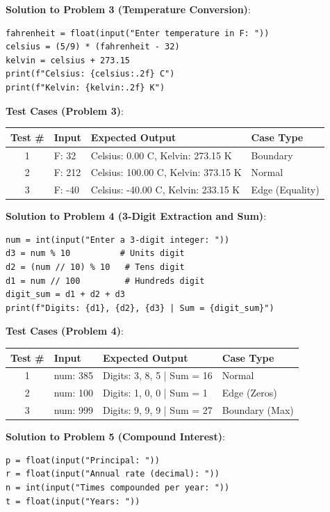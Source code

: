 \begin{solutionbox}
\noindent\textbf{Solution to Problem 3 (Temperature Conversion)}:
\begin{lstlisting}[language=Python3]
fahrenheit = float(input("Enter temperature in F: "))
celsius = (5/9) * (fahrenheit - 32)
kelvin = celsius + 273.15
print(f"Celsius: {celsius:.2f} C")
print(f"Kelvin: {kelvin:.2f} K")
\end{lstlisting}
\vspace{4pt}
\noindent\textbf{Test Cases (Problem 3)}:

\noindent\begin{tabular}{|c|p{4cm}|p{4.5cm}|p{2.2cm}|}
\hline
\textbf{Test \#} & \textbf{Input} & \textbf{Expected Output} & \textbf{Case Type} \\
\hline
1 & F: 32 & Celsius: 0.00 C, Kelvin: 273.15 K & Boundary \\
2 & F: 212 & Celsius: 100.00 C, Kelvin: 373.15 K & Normal \\
3 & F: -40 & Celsius: -40.00 C, Kelvin: 233.15 K & Edge (Equality) \\
\hline
\end{tabular}
\vspace{8pt}

\noindent\textbf{Solution to Problem 4 (3-Digit Extraction and Sum)}:
\begin{lstlisting}[language=Python3]
num = int(input("Enter a 3-digit integer: "))
d3 = num % 10          # Units digit
d2 = (num // 10) % 10   # Tens digit
d1 = num // 100         # Hundreds digit
digit_sum = d1 + d2 + d3
print(f"Digits: {d1}, {d2}, {d3} | Sum = {digit_sum}")
\end{lstlisting}
\vspace{4pt}
\noindent\textbf{Test Cases (Problem 4)}:

\noindent\begin{tabular}{|c|p{4cm}|p{4.5cm}|p{2.2cm}|}
\hline
\textbf{Test \#} & \textbf{Input} & \textbf{Expected Output} & \textbf{Case Type} \\
\hline
1 & num: 385 & Digits: 3, 8, 5 | Sum = 16 & Normal \\
2 & num: 100 & Digits: 1, 0, 0 | Sum = 1 & Edge (Zeros) \\
3 & num: 999 & Digits: 9, 9, 9 | Sum = 27 & Boundary (Max) \\
\hline
\end{tabular}
\vspace{8pt}

\noindent\textbf{Solution to Problem 5 (Compound Interest)}:
\begin{lstlisting}[language=Python3]
p = float(input("Principal: "))
r = float(input("Annual rate (decimal): "))
n = int(input("Times compounded per year: "))
t = float(input("Years: "))


\end{lstlisting}
\end{solutionbox}
